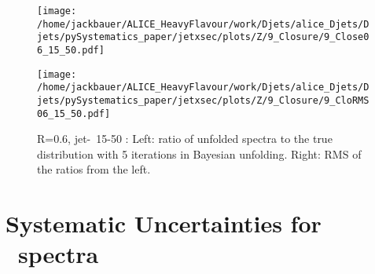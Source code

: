 \begin{figure}
\centering
\begin{minipage}{.5\textwidth}
  \centering
  \texttt{[image: /home/jackbauer/ALICE\_HeavyFlavour/work/Djets/alice\_Djets/Djets/pySystematics\_paper/jetxsec/plots/Z/9\_Closure/9\_Close06\_15\_50.pdf]}
\end{minipage}%
\begin{minipage}{.5\textwidth}
  \centering
  \texttt{[image: /home/jackbauer/ALICE\_HeavyFlavour/work/Djets/alice\_Djets/Djets/pySystematics\_paper/jetxsec/plots/Z/9\_Closure/9\_CloRMS06\_15\_50.pdf]}
\end{minipage}
  \caption{R=0.6, jet-\pt\ 15-50 \GeVc: Left: ratio of unfolded spectra to the true distribution with 5 iterations in Bayesian unfolding. Right: RMS of the ratios from the left.}
  \label{fig:UnfClosZchR06_15_50}
\end{figure}


\section{Systematic Uncertainties for \zch\ spectra}

